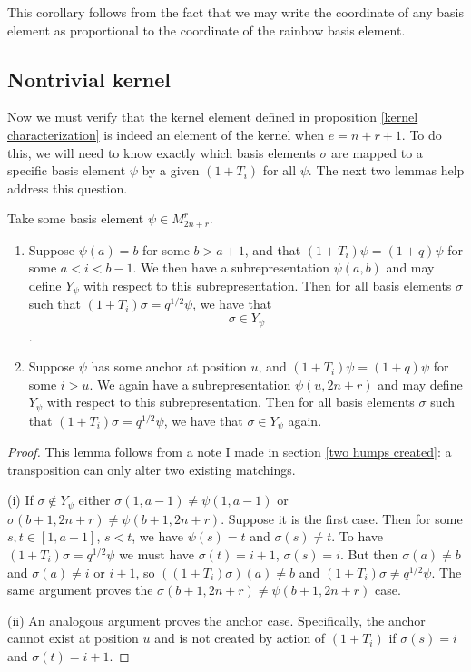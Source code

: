 \documentclass{amsart}
\begin{document}
 This corollary follows from the fact that we may write the coordinate of any basis element as proportional to the coordinate of the rainbow basis element.
 
 
 \subsection{Nontrivial kernel}
 
 
 Now we must verify that the kernel element defined in proposition \ref{kernel characterization} is indeed an element of the kernel when $e=n+r+1$. To do this, we will need to know exactly which basis elements $\sigma$ are mapped to a specific basis element $\psi$ by a given $(1+T_i)$ for all $\psi$. The next two lemmas help address this question.
 
 
 \begin{lemma}
 	Take some basis element $\psi\in M_{2n+r}^r$. 
 	
 	\begin{enumerate}[label={(\roman*)}]
 		
 		\item Suppose $\psi(a)=b$ for some $b>a+1$, and that $(1+T_i)\psi=(1+q)\psi$ for some $a<i<b-1$. We then have a subrepresentation $\psi(a,b)$ and may define $Y_\psi$ with respect to this subrepresentation. Then for all basis elements $\sigma$ such that $(1+T_i)\sigma=q^{1/2}\psi$, we have that $$\sigma\in Y_\psi$$.
 		
 		\item Suppose $\psi$ has some anchor at position $u$, and $(1+T_i)\psi=(1+q)\psi$ for some $i>u$. We again have a subrepresentation $\psi(u,2n+r)$ and may define $Y_\psi$ with respect to this subrepresentation. Then for all basis elements $\sigma$ such that $(1+T_i)\sigma=q^{1/2}\psi$, we have that $\sigma\in Y_\psi$ again.
 		
 		
 	\end{enumerate}
 	\label{preimage under hump}
 \end{lemma}
 
 \begin{proof}
 	This lemma follows from a note I made in section \ref{two humps created}: a transposition can only alter two existing matchings. 
 	
 	(i) If $\sigma\not\in Y_\psi$ either $\sigma(1,a-1)\not=\psi(1,a-1)$ or $\sigma(b+1,2n+r)\not=\psi(b+1,2n+r)$. Suppose it is the first case. Then for some $s,t\in [1,a-1]$, $s<t$, we have $\psi(s)=t$ and $\sigma(s)\not=t$. To have $(1+T_i)\sigma=q^{1/2}\psi$ we must have $\sigma(t)=i+1$, $\sigma(s)=i$. But then $\sigma(a)\not=b$ and $\sigma(a)\not=i$ or $i+1$, so $((1+T_i)\sigma)(a)\not=b$ and $(1+T_i)\sigma\not=q^{1/2}\psi$. The same argument proves the $\sigma(b+1,2n+r)\not=\psi(b+1,2n+r)$ case. 
 	
 	(ii) An analogous argument proves the anchor case. Specifically, the anchor cannot exist at position $u$ and is not created by action of $(1+T_i)$ if $\sigma(s)=i$ and $\sigma(t)=i+1$.
 	
 \end{proof}
 
\end{document}
